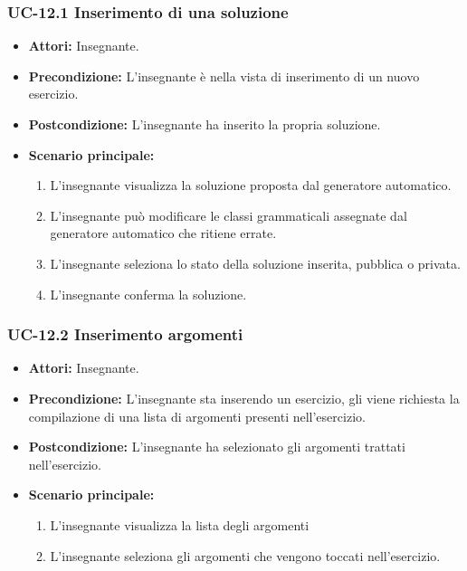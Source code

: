 \subsubsection{UC-12.1 Inserimento di una soluzione}
\begin{itemize}
\item \textbf{Attori: }Insegnante.
\item \textbf{Precondizione: }L'insegnante è nella vista di inserimento di un nuovo esercizio.
\item \textbf{Postcondizione: }L'insegnante ha inserito la propria soluzione.
\item \textbf{Scenario principale: }
		\begin{enumerate} 
		\item L'insegnante visualizza la soluzione proposta dal generatore automatico. 
		\item L'insegnante può modificare le classi grammaticali assegnate dal generatore automatico che ritiene errate.
		\item L'insegnante seleziona lo stato della soluzione inserita, pubblica o privata.
		\item L'insegnante conferma la soluzione.
		\end{enumerate}	
\end{itemize}

\subsubsection{UC-12.2 Inserimento argomenti}
\begin{itemize}
\item \textbf{Attori: }Insegnante.

\item \textbf{Precondizione:} L'insegnante sta inserendo un esercizio, gli viene richiesta la compilazione di una lista di argomenti presenti nell'esercizio.
\item \textbf{Postcondizione:} L'insegnante ha selezionato gli argomenti trattati nell'esercizio.
\item \textbf{Scenario principale: }
		\begin{enumerate}
		\item L'insegnante visualizza la lista degli argomenti
		\item L'insegnante seleziona gli argomenti che vengono toccati nell'esercizio. 
		\end{enumerate}
\end{itemize}				

